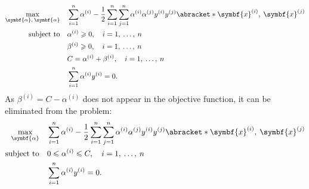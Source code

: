 \documentclass{article}
\begin{document}
\begin{align*}
    \max_{\symbf{\alpha},\: \symbf{\alpha}} \quad & \sum_{i = 1}^n \alpha^{\left( i \right)} - \frac{1}{2} \sum_{i = 1}^n \sum_{j = 1}^n \alpha^{\left( i \right)} \alpha^{\left( j \right)} y^{\left( i \right)} y^{\left( j \right)} \abracket*{\symbf{x}^{\left( i \right)},\: \symbf{x}^{\left( j \right)}} \\
    \text{subject to} \quad                       & \alpha^{\left( i \right)} \geqslant 0, \quad i = 1,\: \dots,\: n                                                                                                                                                                                            \\
                                                  & \beta^{\left( i \right)} \geqslant 0, \quad i = 1,\: \dots,\: n                                                                                                                                                                                             \\
                                                  & C = \alpha^{\left( i \right)} + \beta^{\left( i \right)}, \quad i = 1,\: \dots,\: n                                                                                                                                                                         \\
                                                  & \sum_{i = 1}^n \alpha^{\left( i \right)} y^{\left( i \right)} = 0.
\end{align*}
As \(\beta^{\left( i \right)} = C - \alpha^{\left( i \right)}\) does not
appear in the objective function, it can be eliminated from the problem:
\begin{align*}
    \max_{\symbf{\alpha}} \quad & \sum_{i = 1}^n \alpha^{\left( i \right)} - \frac{1}{2} \sum_{i = 1}^n \sum_{j = 1}^n \alpha^{\left( i \right)} \alpha^{\left( j \right)} y^{\left( i \right)} y^{\left( j \right)} \abracket*{\symbf{x}^{\left( i \right)},\: \symbf{x}^{\left( j \right)}} \\
    \text{subject to} \quad     & 0 \leqslant \alpha^{\left( i \right)} \leqslant C, \quad i = 1,\: \dots,\: n                                                                                                                                                                                \\
                                & \sum_{i = 1}^n \alpha^{\left( i \right)} y^{\left( i \right)} = 0.
\end{align*}
\end{document}
